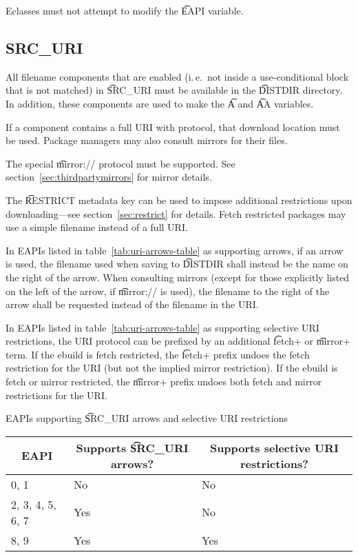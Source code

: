 Eclasses must not attempt to modify the \t{EAPI} variable.

\subsection{SRC_URI}
\label{sec:src-uri-behaviour}

All filename components that are enabled (i.\,e.\ not inside a use-conditional block that is not
matched) in \t{SRC_URI} must be available in the \t{DISTDIR} directory. In addition, these
components are used to make the \t{A} and \t{AA} variables.

If a component contains a full URI with protocol, that download location must be used. Package
managers may also consult mirrors for their files.

The special \t{mirror://} protocol must be supported. See section~\ref{sec:thirdpartymirrors} for
mirror details.

The \t{RESTRICT} metadata key can be used to impose additional restrictions upon downloading---see
section~\ref{sec:restrict} for details. Fetch restricted packages may use a simple filename instead
of a full URI.

 In EAPIs listed in table~\ref{tab:uri-arrows-table} as supporting
arrows, if an arrow is used, the filename used when saving to \t{DISTDIR} shall instead be the name
on the right of the arrow. When consulting mirrors (except for those explicitly listed on the left
of the arrow, if \t{mirror://} is used), the filename to the right of the arrow shall be requested
instead of the filename in the URI.

 In EAPIs listed in table~\ref{tab:uri-arrows-table} as supporting
selective URI restrictions, the URI protocol can be prefixed by an additional \t{fetch+} or
\t{mirror+} term. If the ebuild is fetch restricted, the \t{fetch+} prefix undoes the fetch
restriction for the URI (but not the implied mirror restriction). If the ebuild is fetch or mirror
restricted, the \t{mirror+} prefix undoes both fetch and mirror restrictions for the URI.

\begin{centertable}{EAPIs supporting \t{SRC_URI} arrows and selective URI restrictions}
    \label{tab:uri-arrows-table}
    \begin{tabular}{lll}
      \toprule
      \multicolumn{1}{c}{\textbf{EAPI}} &
      \multicolumn{1}{c}{\textbf{Supports \t{SRC_URI} arrows?}} &
      \multicolumn{1}{c}{\textbf{Supports selective URI restrictions?}} \\
      \midrule
      0, 1              & No  & No  \\
      2, 3, 4, 5, 6, 7  & Yes & No  \\
      8, 9              & Yes & Yes \\
      \bottomrule
    \end{tabular}
\end{centertable}


